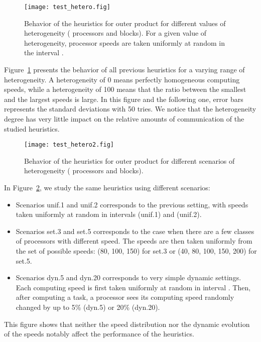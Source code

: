 \documentclass[a4paper,10pt]{article}
\begin{document}
\begin{figure}[htbp]
  \centering
  \texttt{[image: test\_hetero.fig]}
  \caption{Behavior of the heuristics for outer product for different
    values of heterogeneity ( processors and  blocks). For a given value
     of heterogeneity, processor speeds are taken uniformly at
    random in the interval . }
  \label{fig.hetero}
\end{figure}

Figure~\ref{fig.hetero} presents the behavior of all previous
heuristics for a varying range of heterogeneity. A heterogeneity of 0
means perfectly homogeneous computing speeds, while a heterogeneity of
100 means that the ratio between the smallest and the largest speeds
is large. In this figure and the following one, error bars represents
the standard deviations with 50 tries. We notice that the
heterogeneity degree has very little impact on the relative amounts of
communication of the studied heuristics.

\begin{figure}[htbp]
  \centering
  \texttt{[image: test\_hetero2.fig]}
  \caption{Behavior of the heuristics for outer product for different scenarios
    of heterogeneity ( processors and  blocks).}
  \label{fig.hetero2}
\end{figure}

In Figure~\ref{fig.hetero2}, we study the same heuristics using
different scenarios:
\begin{itemize}
\item Scenarios unif.1 and unif.2 corresponds to the previous setting,
  with speeds taken uniformly at random in intervals 
  (unif.1) and  (unif.2).
\item Scenarios set.3 and set.5 corresponds to the case when there are
  a few classes of processors with different speed. The speeds are
  then taken uniformly from the set of possible speeds: (80, 100, 150)
  for set.3 or (40, 80, 100, 150, 200) for set.5.
\item Scenarios dyn.5 and dyn.20 corresponds to very simple dynamic
  settings. Each computing speed is first taken uniformly at random in
  interval . Then, after computing a task, a processor sees
  its computing speed randomly changed by up to 5\% (dyn.5) or 20\%
  (dyn.20). 
\end{itemize}
This figure shows that neither the speed distribution nor the dynamic
evolution of the speeds notably affect the performance of the
heuristics.
\end{document}
